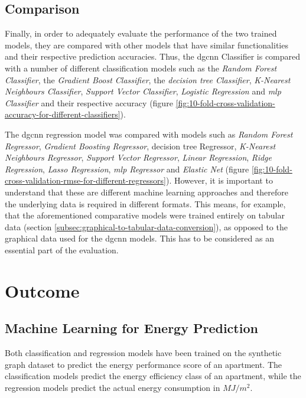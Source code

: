 \documentclass[a4paper, 12pt]{report}
\begin{document}
\subsection{Comparison}\label{subsec:comparison}

Finally, in order to adequately evaluate the performance of the two trained models, they are compared with other models that have similar functionalities and their respective prediction accuracies. Thus, the \acrshort{dgcnn} Classifier is compared with a number of different classification models such as the \textit{Random Forest Classifier}, the \textit{Gradient Boost Classifier}, the \textit{\Gls{decision tree} Classifier}, \textit{K-Nearest Neighbours Classifier}, \textit{Support Vector Classifier}, \textit{Logistic Regression} and \textit{\acrlong{mlp} Classifier} and their respective accuracy (figure \ref{fig:10-fold-cross-validation-accuracy-for-different-classifiers}).

The \acrshort{dgcnn} regression model was compared with models such as \textit{Random Forest Regressor}, \textit{Gradient Boosting Regressor}, \Gls{decision tree} Regressor, \textit{K-Nearest Neighbours Regressor}, \textit{Support Vector Regressor}, \textit{Linear Regression}, \textit{Ridge Regression}, \textit{Lasso Regression}, \textit{\acrlong{mlp} Regressor} and \textit{Elastic Net} (figure \ref{fig:10-fold-cross-validation-rmse-for-different-regressors}). However, it is important to understand that these are different machine learning approaches and therefore the underlying data is required in different formats. This means, for example, that the aforementioned comparative models were trained entirely on tabular data (section \ref{subsec:graphical-to-tabular-data-conversion}), as opposed to the graphical data used for the \acrshort{dgcnn} models. This has to be considered as an essential part of the evaluation.

\section{Outcome}\label{sec:outcome-machine-learning-for-energy-prediction}

\subsection{Machine Learning for Energy Prediction}\label{sec:machine-learning-for-energy-prediction}

Both classification and regression models have been trained on the synthetic graph dataset to predict the energy performance score of an apartment. The classification models predict the energy efficiency class of an apartment, while the regression models predict the actual energy consumption in $MJ/m^2$.
\end{document}
